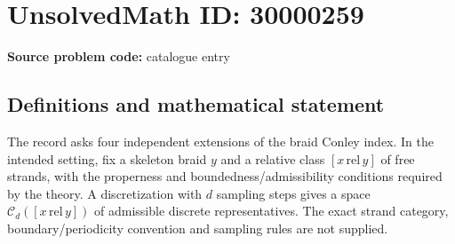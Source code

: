 \documentclass[11pt]{article}
\begin{document}
\section*{UnsolvedMath ID: 30000259}
\textbf{Source problem code:} catalogue entry
\subsection{Definitions and mathematical statement}
The record asks four independent extensions of the braid Conley index. In the intended setting, fix a skeleton braid $y$ and a relative class $[x\,\mathrm{rel}\,y]$ of free strands, with the properness and boundedness/admissibility conditions required by the theory. A discretization with $d$ sampling steps gives a space $\mathcal C_d([x\,\mathrm{rel}\,y])$ of admissible discrete representatives. The exact strand category, boundary/periodicity convention and sampling rules are not supplied.
\end{document}
